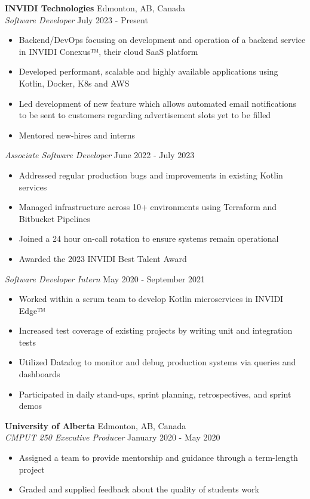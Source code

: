 \documentclass[a4paper]{article}
\begin{document}
\textbf{INVIDI Technologies} \hfill Edmonton, AB, Canada\\
\textit{Software Developer} \hfill July 2023 - Present\\
\vspace{-1mm}
\begin{itemize} \itemsep 1pt
	\item Backend/DevOps focusing on development and operation of a backend service in INVIDI Conexus™, their cloud SaaS platform
	\item Developed performant, scalable and highly available applications using Kotlin, Docker, K8s and AWS
	\item Led development of new feature which allows automated email notifications to be sent to customers regarding advertisement slots yet to be filled
    \item Mentored new-hires and interns
\end{itemize}
\textit{Associate Software Developer} \hfill June 2022 - July 2023\\
\vspace{-1mm}
\begin{itemize} \itemsep 1pt
    \item Addressed regular production bugs and improvements in existing Kotlin services
    \item Managed infrastructure across 10+ environments using Terraform and Bitbucket Pipelines
	\item Joined a 24 hour on-call rotation to ensure systems remain operational
    \item Awarded the 2023 INVIDI Best Talent Award
\end{itemize}
\textit{Software Developer Intern} \hfill May 2020 - September 2021\\
\vspace{-1mm}
\begin{itemize} \itemsep 1pt
	\item Worked within a scrum team to develop Kotlin microservices in INVIDI Edge™
	\item Increased test coverage of existing projects by writing unit and integration tests
	\item Utilized Datadog to monitor and debug production systems via queries and dashboards
	\item Participated in daily stand-ups, sprint planning, retrospectives, and sprint demos
\end{itemize}
\textbf{University of Alberta} \hfill Edmonton, AB, Canada\\
\textit{CMPUT 250 Executive Producer} \hfill January 2020 - May 2020\\
\vspace{-1mm}
\begin{itemize} \itemsep 1pt
    \item Assigned a team to provide mentorship and guidance through a term-length project
	\item Graded and supplied feedback about the quality of student\textquotesingle{}s work
\end{itemize}
\end{document}
